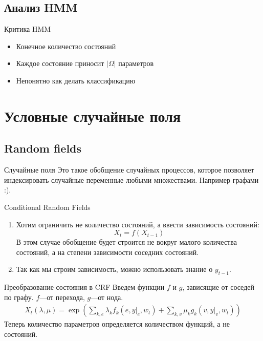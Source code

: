\documentclass[14pt, fleqn, xcolor={dvipsnames, table}]{beamer}
\begin{document}
\subsection{Анализ HMM}
\begin{frame}{Критика HMM}
\begin{itemize}
  \item Конечное количество состояний
  \item Каждое состояние приносит $|\Omega|$ параметров
  \item Непонятно как делать классификацию
\end{itemize}
\end{frame}

\section{Условные случайные поля}

\subsection{Random fields}

\begin{frame}{Случайные поля}
Это такое обобщение случайных процессов, которое позволяет индексировать случайные переменные любыми множествами. Например графами :).
\end{frame}

\begin{frame}{Conditional Random Fields}
\begin{enumerate}
  \item Хотим ограничить не количество состояний, а ввести зависимость состояний:
$$X_t = f(X_{t-1})$$
В этом случае обобщение будет строится не вокруг малого количества состояний, а на степени зависимости соседних состояний.
  \item Так как мы строим зависимость, можно использовать знание о $y_{t-1}$.
\end{enumerate}
\end{frame}

\begin{frame}{Преобразование состояния в CRF}
Введем функции $f$ и $g$, зависящие от соседей по графу. $f$---от перехода, $g$---от нода.
{\small
$$\begin{array}{c}
X_t(\lambda, \mu) =
\exp\left(\sum_{k,e} \lambda_k f_k(e, y|_e, w_t)
 + \sum_{k,v} \mu_k g_k(v, y|_v, w_t) \right)
\end{array}$$
}
Теперь количество параметров определяется количеством функций, а не состояний.
\end{frame}
\end{document}
